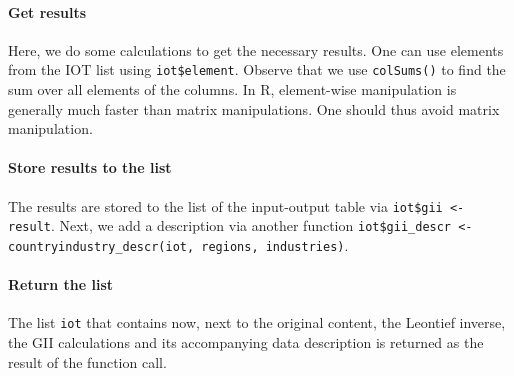 \documentclass[10pt,a4paper]{paper}
\begin{document}
	\paragraph{Get results} Here, we do some calculations to get the necessary results. One can use elements from the IOT list using \texttt{iot\$element}. Observe that we use \texttt{colSums()} to find the sum over all elements of the columns. In R, element-wise manipulation is generally much faster than matrix manipulations. One should thus avoid matrix manipulation. 
	
	\paragraph{Store results to the list}
	The results are stored to the list of the input-output table via  \texttt{iot\$gii <- result}. Next, we add a description via another function \texttt{iot\$gii\_descr <- countryindustry\_descr(iot, regions, industries)}. 
	
	\paragraph{Return the list} The list \texttt{iot} that contains now, next to the original content, the Leontief inverse, the GII calculations and its accompanying data description is returned as the result of the function call.
	
\end{document}
